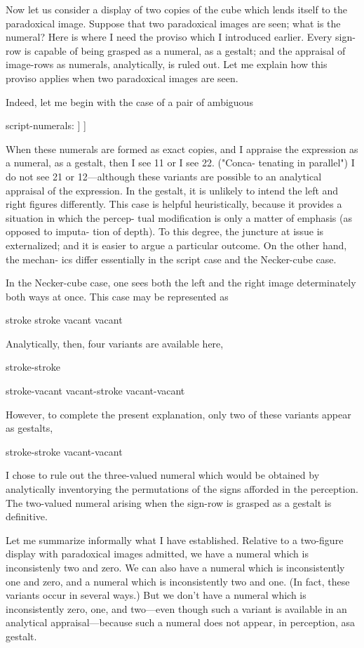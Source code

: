 Now let us consider a display of two copies of the cube which lends 
itself to the paradoxical image. Suppose that two paradoxical images 
are seen; what is the numeral? Here is where I need the proviso which I 
introduced earlier. Every sign-row is capable of being grasped as a 
numeral, as a gestalt; and the appraisal of image-rows as numerals, 
analytically, is ruled out. Let me explain how this proviso applies when 
two paradoxical images are seen. 

Indeed, let me begin with the case of a pair of ambiguous 


script-numerals: ] ] 


When these numerals are formed as exact copies, and I appraise the 
expression as a numeral, as a gestalt, then I see 11 or I see 22. ("Conca- 
tenating in parallel") I do not see 21 or 12---although these variants are 
possible to an analytical appraisal of the expression. In the gestalt, it is 
unlikely to intend the left and right figures differently. This case is 
helpful heuristically, because it provides a situation in which the percep- 
tual modification is only a matter of emphasis (as opposed to imputa- 
tion of depth). To this degree, the juncture at issue is externalized; and it 
is easier to argue a particular outcome. On the other hand, the mechan- 
ics differ essentially in the script case and the Necker-cube case. 

In the Necker-cube case, one sees both the left and the right image 
determinately both ways at once. This case may be represented as 


stroke stroke 
vacant vacant 


Analytically, then, four variants are available here, 


stroke-stroke 

stroke-vacant 
vacant-stroke 
vacant-vacant 


However, to complete the present explanation, only two of these 
variants appear as gestalts, 


stroke-stroke 
vacant-vacant 


I chose to rule out the three-valued numeral which would be obtained 
by analytically inventorying the permutations of the signs afforded in 
the perception. The two-valued numeral arising when the sign-row is 
grasped as a gestalt is definitive. 

Let me summarize informally what I have established. Relative to 
a two-figure display with paradoxical images admitted, we have a 
numeral which is inconsistenly two and zero. We can also have a 
numeral which is inconsistently one and zero, and a numeral which is 
inconsistently two and one. (In fact, these variants occur in several 
ways.) But we don't have a numeral which is inconsistently zero, one, 
and two---even though such a variant is available in an analytical 
appraisal---because such a numeral does not appear, in perception, asa 
gestalt. 

